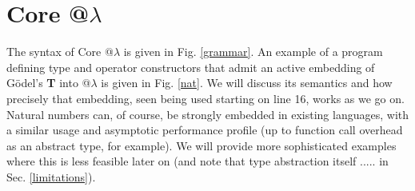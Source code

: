 \documentclass[9pt,preprint]{sigplanconf}
\begin{document}
\section{Core @$\lambda$}\label{core}

%

The syntax of Core @$\lambda$ is given in Fig. \ref{grammar}. An example of a program defining type and operator constructors that admit an active embedding of G\"odel's \textbf{T} into @$\lambda$ is given in Fig. \ref{nat}. We will discuss its semantics and how precisely that embedding, seen being used starting on line 16, works as we go on. Natural numbers can, of course, be strongly embedded in existing languages, with a similar usage and asymptotic performance profile (up to function call overhead as an abstract type, for example). We will provide more sophisticated examples where this is less feasible later on (and note that type abstraction itself ..... in Sec. \ref{limitations}). %
\end{document}
